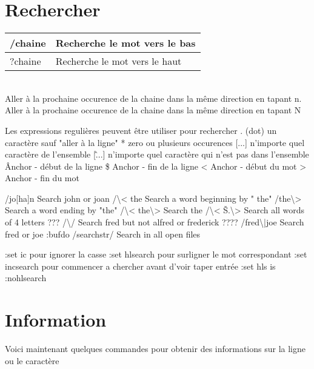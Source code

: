 \documentclass{article}
\begin{document}
\section{Rechercher}
\begin{tabular}{|p{3cm}| l| }
\hline
/chaine & Recherche le mot vers le bas\\ \hline
?chaine & Recherche le mot vers le haut\\ \hline
\end{tabular}\\

\noindent
Aller à la prochaine occurence de la chaine dans la même direction en tapant n.\\
Aller à la prochaine occurence de la chaine dans la même direction en tapant N

Les expressions regulières peuvent être utiliser pour rechercher
. (dot)	un caractère sauf "aller à la ligne"
*	zero ou plusieurs occurences 
[...]	n'importe quel caractère de l'ensemble
[\^...]	n'importe quel caractère qui n'est pas dans l'ensemble
\^	Anchor - début de la ligne
\$	Anchor - fin de la ligne
<	Anchor - début du mot
>	Anchor - fin du mot

/jo[ha]n 	Search john or joan
/\textbackslash{}< the 	Search a word beginning by " the"
/the\textbackslash{}> 		Search a word ending by "the"
/\textbackslash{}< the\textbackslash{}> 	Search the
/\textbackslash{}< Š.\textbackslash{}> 	Search all words of 4 letters ???
/\textbackslash{}/ 	Search fred but not alfred or frederick ????
/fred\textbackslash{}|joe 	Search fred or joe
:bufdo /searchstr/ 	Search in all open files


:set ic 		pour ignorer la casse
:set hlsearch	pour surligner le mot correspondant
:set incsearch	pour commencer a chercher avant d'voir taper entrée
:set hls is
 :nohlsearch
 
 
\section{Information}
Voici maintenant quelques commandes pour obtenir des informations sur la ligne ou le caractère\\
\end{document}
